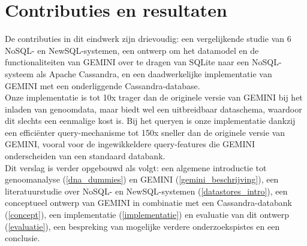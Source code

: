 \section{Contributies en resultaten}

De contributies in dit eindwerk zijn drievoudig: een vergelijkende studie van 6 NoSQL- en NewSQL-systemen, een ontwerp om het datamodel en de functionaliteiten van GEMINI over te dragen van SQLite naar een NoSQL-systeem als Apache Cassandra, en een daadwerkelijke implementatie van GEMINI met een onderliggende Cassandra-database.\\
Onze implementatie is tot 10x trager dan de originele versie van GEMINI bij het inladen van genoomdata, maar biedt wel een uitbreidbaar dataschema, waardoor dit slechts een eenmalige kost is. Bij het queryen is onze implementatie dankzij een effici\"enter query-mechanisme tot 150x sneller dan de originele versie van GEMINI, vooral voor de ingewikkeldere query-features die GEMINI onderscheiden van een standaard databank.\\

Dit verslag is verder opgebouwd als volgt: een algemene introductie tot genoomanalyse (\ref{dna_dummies}) en GEMINI (\ref{gemini_beschrijving}), een literatuurstudie over NoSQL- en NewSQL-systemen (\ref{datastores_intro}), een conceptueel ontwerp van GEMINI in combinatie met een Cassandra-databank (\ref{concept}), een implementatie (\ref{implementatie}) en evaluatie van dit ontwerp (\ref{evaluatie}), een bespreking van mogelijke verdere onderzoekspistes en een conclusie.



